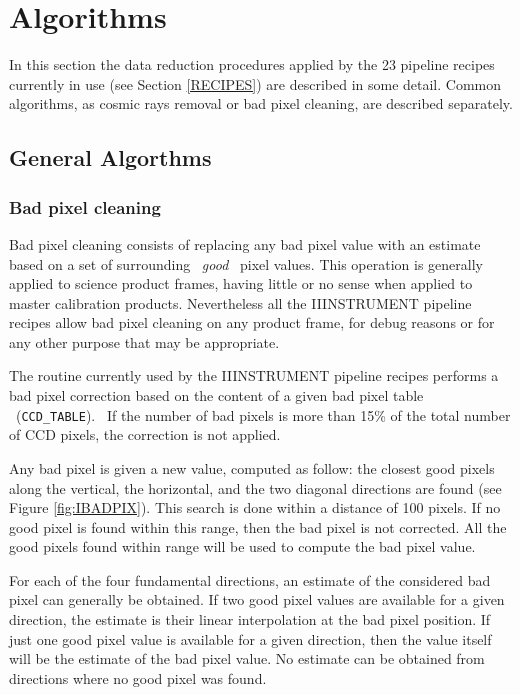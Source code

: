 \section{Algorithms}
\label{sec:ALGORITHMS}

In this section the data reduction procedures applied by the 23 pipeline
recipes currently in use (see Section \ref{RECIPES}) are described 
in some detail. Common algorithms, as cosmic rays removal
or bad pixel cleaning, are described separately.

\subsection{General Algorthms}

\subsubsection{Bad pixel cleaning}
\label{sec:ABADPIX}

Bad pixel cleaning consists of replacing any bad pixel value
with an estimate based on a set of surrounding \ {\it good} 
\ pixel values. This operation is generally applied to science 
product frames, having little or no sense when applied to master 
calibration products. Nevertheless all the IIINSTRUMENT pipeline recipes 
allow bad pixel cleaning on any product frame, for debug reasons 
or for any other purpose that may be appropriate.

The routine currently used by the IIINSTRUMENT pipeline recipes performs 
a bad pixel correction based on the content of a given bad pixel 
table \ ({\tt CCD\_TABLE}). \ If the number of bad pixels is more
than 15\% of the total number of CCD pixels, the correction is not
applied.


Any bad pixel is given a new value, computed as follow: the closest
good pixels along the vertical, the horizontal, and the two diagonal 
directions are found (see Figure \ref{fig:IBADPIX}). This search is
done within a distance of 100 pixels. If no good pixel is found
within this range, then the bad pixel is not corrected.
All the good pixels found within range will 
be used to compute the bad pixel value.

For each of the four fundamental directions, an estimate of the
considered bad pixel can generally be obtained. 
If two good pixel values are available for a given direction,
the estimate is their linear interpolation at the bad pixel position.
If just one good pixel value is available for a given direction, 
then the value itself will be the estimate of the bad pixel value.
No estimate can be obtained from directions where no good pixel
was found.

